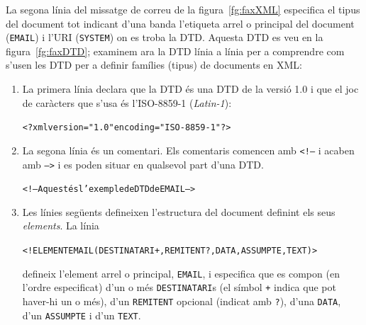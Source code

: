 La segona línia del missatge de correu de la figura~\ref{fg:faxXML}
especifica el tipus del document tot indicant d'una banda l'etiqueta
arrel o principal del document (\texttt{EMAIL}) i l'URI
(\texttt{SYSTEM}) on es troba la DTD. Aquesta DTD es veu en la
figura~\ref{fg:faxDTD}; examinem ara la DTD línia a línia per a
comprendre com s'usen les DTD per a definir famílies (tipus) de
documents en XML:
\begin{enumerate}
\item La primera línia declara que la DTD és una DTD de la versió 1.0
  i que el joc de caràcters que s'usa és l'ISO-8859-1
  (\emph{Latin-1}):
\begin{small}\begin{alltt}
<?xml version="1.0" encoding="ISO-8859-1"?>
\end{alltt}\end{small}

\item La segona línia és un comentari. Els comentaris comencen amb
  \texttt{<!--} i acaben amb \texttt{-->} i es poden situar en
  qualsevol part d'una DTD.
\begin{small}\begin{alltt}
<!-- Aquest és l'exemple de DTD de EMAIL -->
\end{alltt}\end{small}

\item Les línies següents defineixen l'estructura del document
  definint els seus \emph{elements}. La línia
\begin{small}\begin{alltt}
<!ELEMENT EMAIL (DESTINATARI+, REMITENT?, DATA, ASSUMPTE, TEXT)>
\end{alltt}\end{small}
defineix l'element arrel o principal, \texttt{EMAIL}, i especifica que
es compon (en l'ordre especificat) d'un o més \texttt{DESTINATARI}s
(el símbol \texttt{+} indica que pot haver-hi un o més), d'un
\texttt{REMITENT} opcional (indicat amb \texttt{?}), d'una
\texttt{DATA}, d'un \texttt{ASSUMPTE} i d'un \texttt{TEXT}.


\end{enumerate}
